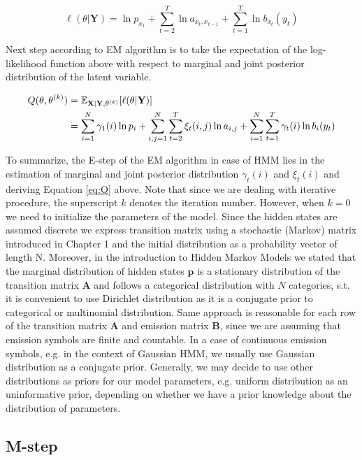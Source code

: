 \begin{equation}
    \ell(\theta|\textbf{Y}) = \ln p_{x_1} + \sum_{t=2}^{T} \ln a_{x_t,x_{t-1}} + \sum_{t=1}^{T} \ln b_{x_t}(y_t)
\end{equation}

Next step according to EM algorithm is to take the expectation of the log-likelihood function above with respect to marginal and joint 
posterior distribution of the latent variable.

\begin{align} \label{eq:Q}
Q(\theta, \theta^{(k)}) &= \mathbb{E}_{\textbf{X}|\textbf{Y},\theta^{(k)}} [\ell(\theta|\textbf{Y})]  \\ \notag
                        &= \sum_{i=1}^{N} \gamma_1(i) \ln p_i + \sum_{i,j=1}^{N} \sum_{t=2}^{T} \xi_t (i,j) \ln a_{i,j}+ \sum_{i=1}^{N} \sum_{t=1}^{T} \gamma_t (i) \ln b_{i}(y_t)
\end{align}

To summarize, the E-step of the EM algorithm in case of HMM lies in the estimation of marginal and joint posterior distribution $\gamma_t(i)$ and $\xi_t(i)$ 
and deriving Equation \ref{eq:Q} above. Note that since we are dealing with iterative procedure, the superscript $k$ denotes the iteration number.
However, when $k=0$ we need to initialize the parameters of the model. Since the hidden states are assumed discrete we express transition matrix using a stochastic (Markov) 
matrix introduced in Chapter 1 and the initial distribution as a probability vector of length N. Moreover, in the introduction to Hidden Markov Models 
we stated that the marginal distribution of hidden states $\textbf{p}$ is a stationary distribution of the transition matrix $\textbf{A}$ and follows a 
categorical distribution with $N$ categories, s.t. it is convenient to use Dirichlet distribution as it is a conjugate prior to categorical or multinomial distribution.
Same approach is reasonable for each row of the transition matrix $\textbf{A}$ and emission matrix $\textbf{B}$, since we are assuming that emission symbols are finite and countable. 
In a case of continuous emission symbols, e.g. in the context of Gaussian HMM, we usually use Gaussian distribution as a conjugate prior. Generally, we may decide to use other distributions as priors for our model parameters, 
e.g. uniform distribution as an uninformative prior, depending on whether we have a prior knowledge about the distribution of parameters. \citep{Rabiner1993}

\subsection*{M-step}


